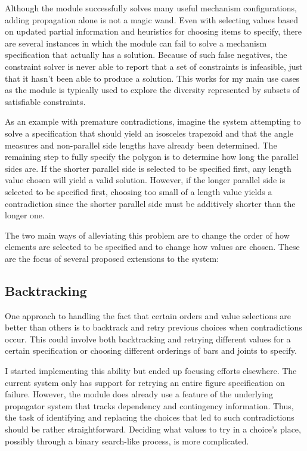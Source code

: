 Although the module successfully solves many useful mechanism
configurations, adding propagation alone is not a magic wand. Even
with selecting values based on updated partial information and
heuristics for choosing items to specify, there are several instances
in which the module can fail to solve a mechanism specification that
actually has a solution. Because of such false negatives, the
constraint solver is never able to report that a set of constraints is
infeasible, just that it hasn't been able to produce a solution. This
works for my main use cases as the module is typically used to explore
the diversity represented by subsets of satisfiable constraints.

As an example with premature contradictions, imagine the system
attempting to solve a specification that should yield an isosceles
trapezoid and that the angle measures and non-parallel side lengths
have already been determined. The remaining step to fully specify the
polygon is to determine how long the parallel sides are. If the
shorter parallel side is selected to be specified first, any length
value chosen will yield a valid solution. However, if the longer
parallel side is selected to be specified first, choosing too small of
a length value yields a contradiction since the shorter parallel side
must be additively shorter than the longer one.

The two main ways of alleviating this problem are to change the order of
how elements are selected to be specified and to change how values are
chosen. These are the focus of several proposed extensions to the system:

\subsection{Backtracking}

One approach to handling the fact that certain orders and value
selections are better than others is to backtrack and retry previous
choices when contradictions occur. This could involve both
backtracking and retrying different values for a certain specification
or choosing different orderings of bars and joints to specify.

I started implementing this ability but ended up focusing efforts
elsewhere. The current system only has support for retrying an entire
figure specification on failure. However, the module does already use
a feature of the underlying propagator system that tracks dependency
and contingency information. Thus, the task of identifying and
replacing the choices that led to such contradictions should be rather
straightforward. Deciding what values to try in a choice's place,
possibly through a binary search-like process, is more complicated.

